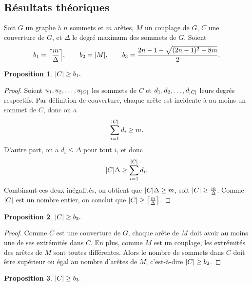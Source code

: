 \documentclass[a4paper,11pt]{amsart}
\theoremstyle{plain}
\newtheorem*{prop}{Proposition}
\DeclarePairedDelimiter{\ceil}{\lceil}{\rceil}
\DeclarePairedDelimiter{\abs}{\lvert}{\rvert}
\begin{document}
\subsection{Résultats théoriques}
\label{AlgoExactTheorique}

Soit $G$ un graphe à $n$ sommets et $m$ arêtes, $M$ un couplage de $G$, $C$ une couverture de $G$, et $\Delta$ le degré maximum des sommets de $G$. Soient
\[
b_1 = \ceil*{\frac{m}{\Delta}}, \qquad b_2 = \abs*{M}, \qquad b_3 = \frac{2n-1-\sqrt{(2n-1)^2 - 8m}}{2}.
\]

\begin{prop}
$\abs{C} \geq b_1.$
\end{prop}

\begin{proof}
Soient $u_1, u_2, \dotsc, u_{\abs{C}}$ les sommets de $C$ et $d_1, d_2, \dotsc, d_{\abs{C}}$ leurs degrés respectifs. Par définition de couverture, chaque arête est incidente à au mo\-ins un sommet de $C$, donc on a
\[
\sum_{i=1}^{\abs{C}} d_i \geq m.
\]
D'autre part, on a $d_i \leq \Delta$ pour tout $i$, et donc
\[
\abs{C} \Delta \geq \sum_{i=1}^{\abs{C}} d_i.
\]
Combinant ces deux inégalités, on obtient que $\abs{C} \Delta \geq m$, soit $\abs{C} \geq \frac{m}{\Delta}$. Comme $\abs{C}$ est un nombre entier, on conclut que $\abs{C} \geq \ceil*{\frac{m}{\Delta}}$.
\end{proof}

\begin{prop}
$\abs{C} \geq b_2.$
\end{prop}

\begin{proof}
Comme $C$ est une couverture de $G$, chaque arête de $M$ doit avoir au moins une de ses extrémités dans $C$. En plus, comme $M$ est un couplage, les extrémités des arêtes de $M$ sont toutes différentes. Alors le nombre de sommets dans $C$ doit être supérieur ou égal au nombre d'arêtes de $M$, c'est-à-dire $\abs{C} \geq b_2$.
\end{proof}

\begin{prop}
$\abs{C} \geq b_3.$
\end{prop}
\end{document}
